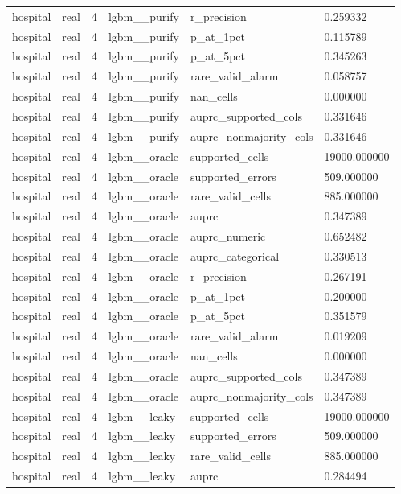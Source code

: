 \begin{tabular}{llllll}
hospital & real & 4 & lgbm\_\_purify & r\_precision & 0.259332 \\
hospital & real & 4 & lgbm\_\_purify & p\_at\_1pct & 0.115789 \\
hospital & real & 4 & lgbm\_\_purify & p\_at\_5pct & 0.345263 \\
hospital & real & 4 & lgbm\_\_purify & rare\_valid\_alarm & 0.058757 \\
hospital & real & 4 & lgbm\_\_purify & nan\_cells & 0.000000 \\
hospital & real & 4 & lgbm\_\_purify & auprc\_supported\_cols & 0.331646 \\
hospital & real & 4 & lgbm\_\_purify & auprc\_nonmajority\_cols & 0.331646 \\
hospital & real & 4 & lgbm\_\_oracle & supported\_cells & 19000.000000 \\
hospital & real & 4 & lgbm\_\_oracle & supported\_errors & 509.000000 \\
hospital & real & 4 & lgbm\_\_oracle & rare\_valid\_cells & 885.000000 \\
hospital & real & 4 & lgbm\_\_oracle & auprc & 0.347389 \\
hospital & real & 4 & lgbm\_\_oracle & auprc\_numeric & 0.652482 \\
hospital & real & 4 & lgbm\_\_oracle & auprc\_categorical & 0.330513 \\
hospital & real & 4 & lgbm\_\_oracle & r\_precision & 0.267191 \\
hospital & real & 4 & lgbm\_\_oracle & p\_at\_1pct & 0.200000 \\
hospital & real & 4 & lgbm\_\_oracle & p\_at\_5pct & 0.351579 \\
hospital & real & 4 & lgbm\_\_oracle & rare\_valid\_alarm & 0.019209 \\
hospital & real & 4 & lgbm\_\_oracle & nan\_cells & 0.000000 \\
hospital & real & 4 & lgbm\_\_oracle & auprc\_supported\_cols & 0.347389 \\
hospital & real & 4 & lgbm\_\_oracle & auprc\_nonmajority\_cols & 0.347389 \\
hospital & real & 4 & lgbm\_\_leaky & supported\_cells & 19000.000000 \\
hospital & real & 4 & lgbm\_\_leaky & supported\_errors & 509.000000 \\
hospital & real & 4 & lgbm\_\_leaky & rare\_valid\_cells & 885.000000 \\
hospital & real & 4 & lgbm\_\_leaky & auprc & 0.284494 \\

\end{tabular}
